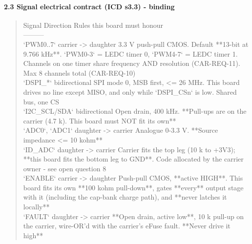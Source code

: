 \documentclass[11pt,a4paper]{article}
\begin{document}
\paragraph*{2.3 Signal electrical contract (ICD s3.3) - binding}
\begin{quote}\small\ttfamily\raggedright
\textbar{} Signal \textbar{} Direction \textbar{} Rules this board must honour \textbar{}\\
\textbar{}---\textbar{}---\textbar{}---\textbar{}\\
\textbar{} `PWM0..7` \textbar{} carrier -\textgreater{} daughter \textbar{} 3.3 V push-pull CMOS. Default {*}{*}13-bit at 9.766 kHz{*}{*}. `PWM0-3` = LEDC timer 0, `PWM4-7` = LEDC timer 1. Channels on one timer share frequency AND resolution (CAR-REQ-11). Max 8 channels total (CAR-REQ-10) \textbar{}\\
\textbar{} `DSPI\_{*}` \textbar{} bidirectional \textbar{} SPI mode 0, MSB first, \textless{}= 26 MHz. This board drives no line except MISO, and only while `DSPI\_CSn` is low. Shared bus, one CS \textbar{}\\
\textbar{} `I2C\_SCL/SDA` \textbar{} bidirectional \textbar{} Open drain, 400 kHz. {*}{*}Pull-ups are on the carrier (4.7 k). This board must NOT fit its own{*}{*} \textbar{}\\
\textbar{} `ADC0`, `ADC1` \textbar{} daughter -\textgreater{} carrier \textbar{} Analogue 0-3.3 V. {*}{*}Source impedance \textless{}= 10 kohm{*}{*} \textbar{}\\
\textbar{} `ID\_ADC` \textbar{} daughter -\textgreater{} carrier \textbar{} Carrier fits the top leg (10 k to +3V3); {*}{*}this board fits the bottom leg to GND{*}{*}. Code allocated by the carrier owner - see open question 8 \textbar{}\\
\textbar{} `ENABLE` \textbar{} carrier -\textgreater{} daughter \textbar{} Push-pull CMOS, {*}{*}active HIGH{*}{*}. This board fits its own {*}{*}100 kohm pull-down{*}{*}, gates {*}{*}every{*}{*} output stage with it (including the cap-bank charge path), and {*}{*}never latches it locally{*}{*} \textbar{}\\
\textbar{} `FAULT` \textbar{} daughter -\textgreater{} carrier \textbar{} {*}{*}Open drain, active low{*}{*}, 10 k pull-up on the carrier, wire-OR'd with the carrier's eFuse fault. {*}{*}Never drive it high{*}{*} \textbar{}
\end{quote}
\end{document}
